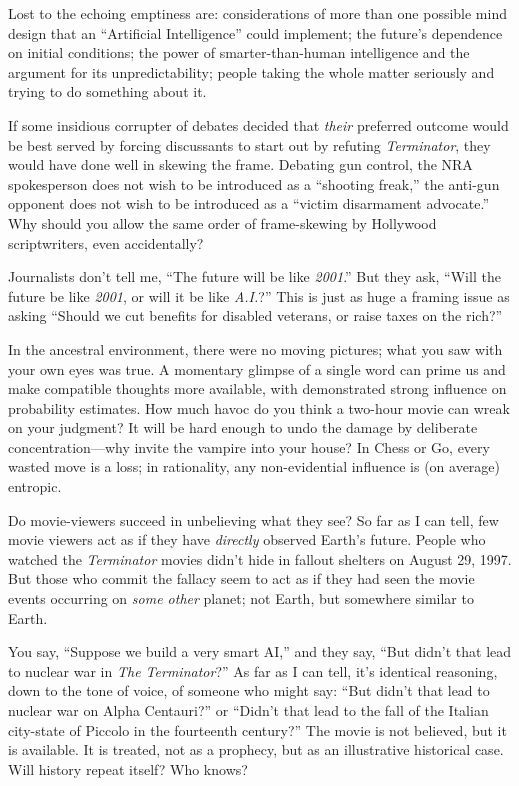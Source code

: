 {
 Lost to the echoing emptiness are: considerations of more than one
possible mind design that an ``Artificial
Intelligence'' could implement; the
future's dependence on initial conditions; the power of
smarter-than-human intelligence and the argument for its
unpredictability; people taking the whole matter seriously and trying
to do something about it.}

{
 If some insidious corrupter of debates decided that \textit{their}
preferred outcome would be best served by forcing discussants to start
out by refuting \textit{Terminator}, they would have done well in
skewing the frame. Debating gun control, the NRA spokesperson does not
wish to be introduced as a ``shooting
freak,'' the anti-gun opponent does not wish to be
introduced as a ``victim disarmament
advocate.'' Why should you allow the same order of
frame-skewing by Hollywood scriptwriters, even accidentally?}

{
 Journalists don't tell me, ``The
future will be like \textit{2001}.'' But they ask,
``Will the future be like \textit{2001}, or will it be
like \textit{A.I.}?'' This is just as huge a framing
issue as asking ``Should we cut benefits for disabled
veterans, or raise taxes on the rich?''}

{
 In the ancestral environment, there were no moving pictures; what
you saw with your own eyes was true. A momentary glimpse of a single
word can prime us and make compatible thoughts more available, with
demonstrated strong influence on probability estimates. How much havoc
do you think a two-hour movie can wreak on your judgment? It will be
hard enough to undo the damage by deliberate concentration---why invite
the vampire into your house? In Chess or Go, every wasted move is a
loss; in rationality, any non-evidential influence is (on average)
entropic.}

{
 Do movie-viewers succeed in unbelieving what they see? So far as I
can tell, few movie viewers act as if they have \textit{directly}
observed Earth's future. People who watched the
\textit{Terminator} movies didn't hide in fallout
shelters on August 29, 1997. But those who commit the fallacy seem to
act as if they had seen the movie events occurring on \textit{some
other} planet; not Earth, but somewhere similar to Earth.}

{
 You say, ``Suppose we build a very smart
AI,'' and they say, ``But
didn't that lead to nuclear war in \textit{The
Terminator}?'' As far as I can tell,
it's identical reasoning, down to the tone of voice, of
someone who might say: ``But didn't
that lead to nuclear war on Alpha Centauri?'' or
``Didn't that lead to the fall of the
Italian city-state of Piccolo in the fourteenth
century?'' The movie is not believed, but it is
available. It is treated, not as a prophecy, but as an illustrative
historical case. Will history repeat itself? Who knows?}

